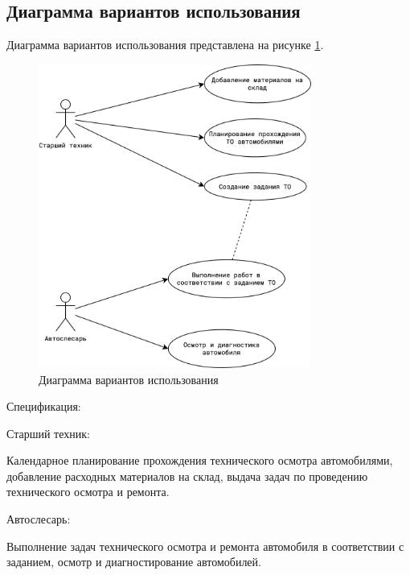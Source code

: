 \subsection{Диаграмма вариантов использования}
Диаграмма вариантов использования представлена на рисунке
\ref{fig:diag-use-case}.

\begin{figure}[H]
\centering
\includegraphics[keepaspectratio,width=0.8\textwidth]{./images/use-case.png}
\caption{Диаграмма вариантов использования}
\label{fig:diag-use-case}
\end{figure}

Спецификация:

Старший техник:

Календарное планирование прохождения технического осмотра автомобилями,
добавление расходных материалов на склад, выдача задач по проведению
технического осмотра и ремонта.

Автослесарь:

Выполнение задач технического осмотра и ремонта автомобиля в соответствии с
заданием, осмотр и диагностирование автомобилей.
